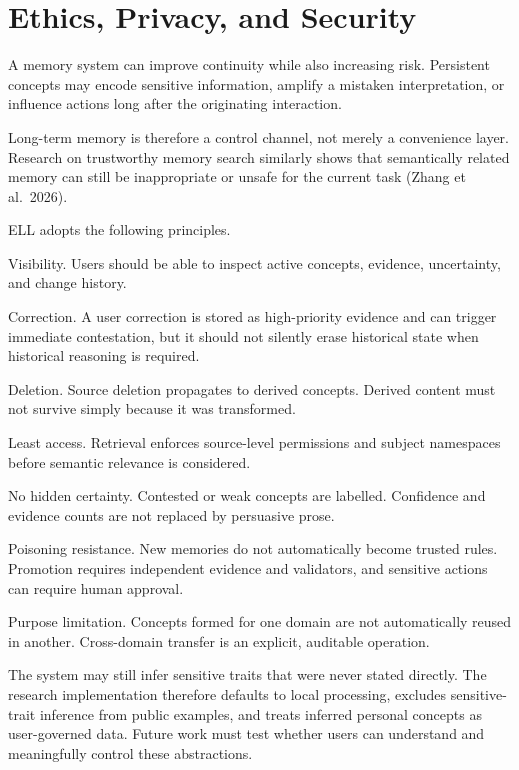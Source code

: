 \documentclass[
  english,
  a4paper,
  DIV=11,
  numbers=noendperiod]{scrreprt}
\begin{document}

\chapter{Ethics, Privacy, and
Security}\label{ethics-privacy-and-security}

A memory system can improve continuity while also increasing risk.
Persistent concepts may encode sensitive information, amplify a mistaken
interpretation, or influence actions long after the originating
interaction.

Long-term memory is therefore a control channel, not merely a
convenience layer. Research on trustworthy memory search similarly shows
that semantically related memory can still be inappropriate or unsafe
for the current task (Zhang et al.~2026).

ELL adopts the following principles.

Visibility. Users should be able to inspect active concepts, evidence,
uncertainty, and change history.

Correction. A user correction is stored as high-priority evidence and
can trigger immediate contestation, but it should not silently erase
historical state when historical reasoning is required.

Deletion. Source deletion propagates to derived concepts. Derived
content must not survive simply because it was transformed.

Least access. Retrieval enforces source-level permissions and subject
namespaces before semantic relevance is considered.

No hidden certainty. Contested or weak concepts are labelled. Confidence
and evidence counts are not replaced by persuasive prose.

Poisoning resistance. New memories do not automatically become trusted
rules. Promotion requires independent evidence and validators, and
sensitive actions can require human approval.

Purpose limitation. Concepts formed for one domain are not automatically
reused in another. Cross-domain transfer is an explicit, auditable
operation.

The system may still infer sensitive traits that were never stated
directly. The research implementation therefore defaults to local
processing, excludes sensitive-trait inference from public examples, and
treats inferred personal concepts as user-governed data. Future work
must test whether users can understand and meaningfully control these
abstractions.
\end{document}
